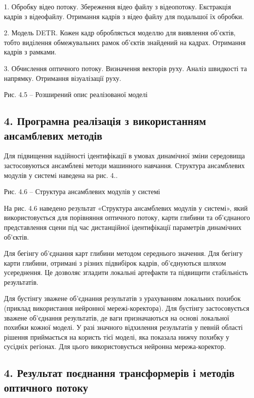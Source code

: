 \documentclass[
]{article}
\begin{document}
1. Обробку відео потоку. Збереження відео файлу з відеопотоку. Екстракція кадрів з відеофайлу. Отримання кадрів з відео файлу для подальшої їх обробки.

2. Модель DETR. Кожен кадр обробляється моделлю для виявлення об'єктів, тобто виділення обмежувальних рамок об'єктів знайдений на кадрах. Отримання кадрів з рамками.

3. Обчислення оптичного потоку. Визначення векторів руху. Аналіз швидкості та напрямку. Отримання візуалізації руху.

Рис. 4.5 -- Розширений опис реалізованої моделі

\subsection{4. Програмна реалізація з використанням ансамблевих методів}\label{ux43fux440ux43eux433ux440ux430ux43cux43dux430-ux440ux435ux430ux43bux456ux437ux430ux446ux456ux44f-ux437-ux432ux438ux43aux43eux440ux438ux441ux442ux430ux43dux43dux44fux43c-ux430ux43dux441ux430ux43cux431ux43bux435ux432ux438ux445-ux43cux435ux442ux43eux434ux456ux432}

Для підвищення надійності ідентифікації в умовах динамічної зміни середовища застосовуються ансамблеві методи машинного навчання. Структура ансамблевих модулів у системі наведена на рис. 4..

Рис. 4.6 -- Структура ансамблевих модулів у системі

На рис. 4.6 наведено результат «Структура ансамблевих модулів у системі», який використовується для порівняння оптичного потоку, карти глибини та об'єднаного представлення сцени під час дистанційної ідентифікації параметрів динамічних об'єктів.

Для бегінгу об'єднання карт глибини методом середнього значення. Для бегінгу карти глибини, отримані з різних підвибірок кадрів, об'єднуються шляхом усереднення. Це дозволяє згладити локальні артефакти та підвищити стабільність результатів.

Для бустінгу зважене об'єднання результатів з урахуванням локальних похибок (приклад використання нейронної мережі-коректора). Для бустінгу застосовується зважене об'єднання результатів, де ваги призначаються на основі локальної похибки кожної моделі. У разі значного відхилення результатів у певній області рішення приймається на користь тієї моделі, яка показала нижчу похибку у сусідніх регіонах. Для цього використовується нейронна мережа-коректор.

\subsection{4. Результат поєднання трансформерів і методів оптичного потоку}\label{ux440ux435ux437ux443ux43bux44cux442ux430ux442-ux43fux43eux454ux434ux43dux430ux43dux43dux44f-ux442ux440ux430ux43dux441ux444ux43eux440ux43cux435ux440ux456ux432-ux456-ux43cux435ux442ux43eux434ux456ux432-ux43eux43fux442ux438ux447ux43dux43eux433ux43e-ux43fux43eux442ux43eux43aux443}
\end{document}
